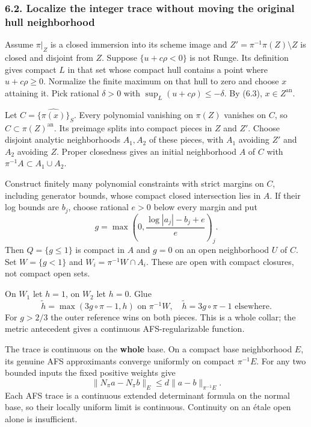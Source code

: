 \documentclass[
  10pt,
]{article}
\begin{document}
\subsubsection{6.2. Localize the integer trace without moving the
original hull
neighborhood}\label{localize-the-integer-trace-without-moving-the-original-hull-neighborhood}

Assume \(\pi|_Z\) is a closed immersion into its scheme image and
\(Z'=\pi^{-1}\pi(Z)\setminus Z\) is closed and disjoint from \(Z\).
Suppose \(\{u+c\rho<0\}\) is not Runge. Its definition gives compact
\(L\) in that set whose compact hull contains a point where
\(u+c\rho\ge0\). Normalize the finite maximum on that hull to zero and
choose \(x\) attaining it. Pick rational \(\delta>0\) with
\(\sup_L(u+c\rho)\le-\delta\). By (6.3), \(x\in Z^{\mathrm{an}}\).

Let \(C=\widehat{\{\pi(x)\}}_S\). Every polynomial vanishing on
\(\pi(Z)\) vanishes on \(C\), so \(C\subset\pi(Z)^{\mathrm{an}}\). Its
preimage splits into compact pieces in \(Z\) and \(Z'\). Choose disjoint
analytic neighborhoods \(A_1,A_2\) of these pieces, with \(A_1\)
avoiding \(Z'\) and \(A_2\) avoiding \(Z\). Proper closedness gives an
initial neighborhood \(A\) of \(C\) with
\(\pi^{-1}A\subset A_1\cup A_2\).

Construct finitely many polynomial constraints with strict margins on
\(C\), including generator bounds, whose compact closed intersection
lies in \(A\). If their log bounds are \(b_j\), choose rational \(e>0\)
below every margin and put
\[g=\max\left(0,\frac{\log|a_j|-b_j+e}{e}\right)_j.\] Then
\(Q=\{g\le1\}\) is compact in \(A\) and \(g=0\) on an open neighborhood
\(U\) of \(C\). Set \(W=\{g<1\}\) and \(W_i=\pi^{-1}W\cap A_i\). These
are open with compact closures, not compact open sets.

On \(W_1\) let \(h=1\), on \(W_2\) let \(h=0\). Glue
\[\widetilde h=\max(3g\circ\pi-1,h)\text{ on }\pi^{-1}W,
 \quad\widetilde h=3g\circ\pi-1\text{ elsewhere}. \tag{6.4}\] For
\(g>2/3\) the outer reference wins on both pieces. This is a whole
collar; the metric antecedent gives a continuous AFS-regularizable
function.

The trace is continuous on the \textbf{whole} base. On a compact base
neighborhood \(E\), its genuine AFS approximants converge uniformly on
compact \(\pi^{-1}E\). For any two bounded inputs the fixed positive
weights give
\[\|N_\pi a-N_\pi b\|_E\le d\|a-b\|_{\pi^{-1}E}. \tag{6.5}\] Each AFS
trace is a continuous extended determinant formula on the normal base,
so their locally uniform limit is continuous. Continuity on an étale
open alone is insufficient.
\end{document}
